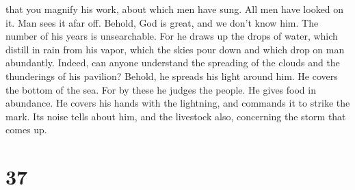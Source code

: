 that you magnify his work, about which men have sung. 
All men have looked on it. Man sees it afar off.  Behold,
God is great, and we don't know him. The number of his years is
unsearchable.  For he draws up the drops of water, which
distill in rain from his vapor,  which the skies pour
down and which drop on man abundantly.  Indeed, can
anyone understand the spreading of the clouds and the thunderings of his
pavilion?  Behold, he spreads his light around him. He
covers the bottom of the sea.  For by these he judges the
people. He gives food in abundance.  He covers his hands
with the lightning, and commands it to strike the mark. 
Its noise tells about him, and the livestock also, concerning the storm
that comes up.

\hypertarget{section-36}{%
\section{37}\label{section-36}}

